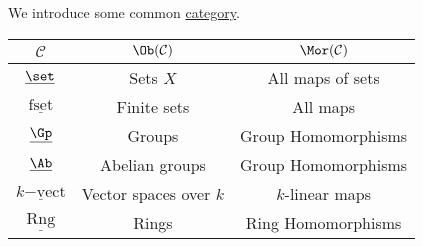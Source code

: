 \begin{eg}
	We introduce some common \hyperref[def:category]{category}.
	\begin{table}[H]
		\centering
		\begin{tabular}{c|c|c}
			\toprule
			\(\mathcal{C} \)                & \(\Ob(\mathcal{C} )\)                                                                              & \(\Mor (\mathcal{C} )\)                                                                                                                                       \\
			\midrule
			\(\underline{\set}\)            & Sets \(X\)                                                                                         & All maps of sets                                                                                                                                              \\
			\(\underline{\mathrm{fset}}\)   & Finite sets                                                                                        & All maps                                                                                                                                                      \\
			\(\underline{\Gp}\)             & Groups                                                                                             & Group Homomorphisms                                                                                                                                           \\
			\(\underline{\Ab}\)             & Abelian groups                                                                                     & Group Homomorphisms                                                                                                                                           \\
			\(\underline{k\mathrm{-vect}}\) & Vector spaces over \(k\)                                                                           & \(k\)-linear maps                                                                                                                                             \\
			\(\underline{\mathrm{Rng}}\)    & Rings                                                                                              & Ring Homomorphisms                                                                                                                                            \\

\end{tabular}
\end{table}
\end{eg}
